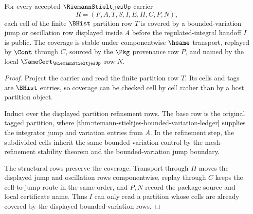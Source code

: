 \begin{theorem}
\label{thm:riemann-stieltjes-bounded-variation-partition-coverage}
For every accepted $\RiemannStieltjesUp$ carrier
$$
R=(F,A,T,S,I,E,H,C,P,N),
$$
each cell of the finite $\BHist$ partition row $T$ is covered by a bounded-variation jump or oscillation row displayed inside $A$ before the regulated-integral handoff $I$ is public. The coverage is stable under componentwise $\hsame$ transport, replayed by $\Cont$ through $C$, sourced by the $\Pkg$ provenance row $P$, and named by the local $\NameCert_{\RiemannStieltjesUp}$ row $N$.
\end{theorem}
\begin{proof}
Project the carrier and read the finite partition row $T$. Its cells and tags are $\BHist$ entries, so coverage can be checked cell by cell rather than by a host partition object.

Induct over the displayed partition refinement rows. The base row is the original tagged partition, where \autoref{thm:riemann-stieltjes-bounded-variation-ledger} supplies the integrator jump and variation entries from $A$. In the refinement step, the subdivided cells inherit the same bounded-variation control by the mesh-refinement stability theorem and the bounded-variation jump boundary.

The structural rows preserve the coverage. Transport through $H$ moves the displayed jump and oscillation rows componentwise, replay through $C$ keeps the cell-to-jump route in the same order, and $P,N$ record the package source and local certificate name. Thus $I$ can only read a partition whose cells are already covered by the displayed bounded-variation rows.
\end{proof}

